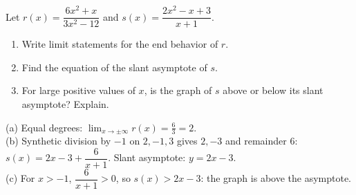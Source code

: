 \begin{exo}{}
Let $r(x)=\dfrac{6x^2+x}{3x^2-12}$ and $s(x)=\dfrac{2x^2-x+3}{x+1}$.
\begin{enumerate}[label=(\alph*)]
\item Write limit statements for the end behavior of $r$.
\item Find the equation of the slant asymptote of $s$.
\item For large positive values of $x$, is the graph of $s$ above or below its slant asymptote? Explain.
\end{enumerate}
\begin{solution}
(a) Equal degrees: $\lim_{x\to\pm\infty}r(x)=\frac63=2$.\\
(b) Synthetic division by $-1$ on $2,-1,3$ gives $2,-3$ and remainder $6$: $s(x)=2x-3+\dfrac{6}{x+1}$. Slant asymptote: $y=2x-3$.\\
(c) For $x>-1$, $\dfrac{6}{x+1}>0$, so $s(x)>2x-3$: the graph is above the asymptote.
\end{solution}
\end{exo}

